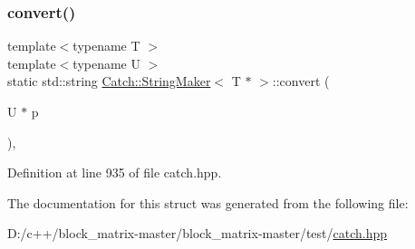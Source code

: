 \subsubsection{\texorpdfstring{convert()}{convert()}}
{\footnotesize\ttfamily template$<$typename T $>$ \\
template$<$typename U $>$ \\
static std\+::string \mbox{\hyperlink{struct_catch_1_1_string_maker}{Catch\+::\+String\+Maker}}$<$ T $\ast$ $>$\+::convert (\begin{DoxyParamCaption}\item[{U $\ast$}]{p }\end{DoxyParamCaption})\hspace{0.3cm}{\ttfamily [inline]}, {\ttfamily [static]}}



Definition at line 935 of file catch.\+hpp.



The documentation for this struct was generated from the following file\+:\begin{DoxyCompactItemize}
\item 
D\+:/c++/block\+\_\+matrix-\/master/block\+\_\+matrix-\/master/test/\mbox{\hyperlink{catch_8hpp}{catch.\+hpp}}\end{DoxyCompactItemize}
